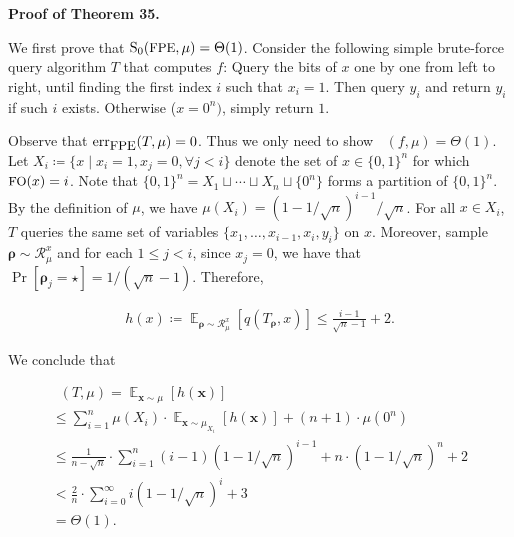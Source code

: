 \par\medskip\noindent\textbf{Proof of Theorem 35.}\par




We first prove that ${\textup{S}}_{0}({\textrm{\small{FPE}}},\mu)=\Theta(1)$.
Consider the following simple brute-force query algorithm $T$ that computes $f$: Query the bits of $x$ one by one from left to right, until finding the first index $i$ such that $x_{i}=1$. Then query $y_{i}$ and return $y_{i}$ if such $i$ exists. Otherwise ($x=0^{n})$, simply return $1$.\par




Observe that $\mathrm{err}_{\textrm{\small{FPE}}}(T,\mu)=0$.
Thus we only need to show $\mathop{\overline{sq}}(f,\mu)=\Theta(1)$.
Let $X_{i}\coloneqq\{x\mid x_{i}=1,x_{j}=0,\forall j<i\}$ denote the set of $x\in\{0,1\}^{n}$ for which ${\textrm{\small{FO}}}(x)=i$.
Note that $\{0,1\}^{n}=X_{1}\sqcup\cdots\sqcup X_{n}\sqcup\{0^{n}\}$ forms a partition of $\{0,1\}^{n}$.
By the definition of $\mu$, we have $\mu(X_{i})=(1-1/\sqrt{n})^{i-1}/\sqrt{n}$.
For all $x\in X_{i}$, $T$ queries the same set of variables $\{x_{1},\ldots,x_{i-1},x_{i},y_{i}\}$ on $x$.
Moreover, sample $\bm{\rho}\sim\mathcal{R}_{\mu}^{x}$ and for each $1\leq j<i$, since $x_{j}=0$, we have that $\Pr[\bm{\rho}_{j}=\star]=1/(\sqrt{n}-1)$. Therefore,\par


\[\begin{gathered}
h(x)\coloneqq\mathop{\mathbb{E}}\nolimits_{\bm{\rho}\sim\mathcal{R}^{x}_{\mu}}[q(T_{\bm{\rho}},x)]\leq\frac{i-1}{\sqrt{n}-1}+2.
\end{gathered}\]


We conclude that\par


\[\begin{gathered}
\displaystyle\mathop{\overline{sq}}(T,\mu) \displaystyle=\mathop{\mathbb{E}}_{\bm{x}\sim\mu}\left[h(\bm{x})\right] \\
\displaystyle\leq\sum\nolimits_{i=1}^{n}\mu(X_{i})\cdot\mathop{\mathbb{E}}\nolimits_{\bm{x}\sim\mu_{X_{i}}}[h(\bm{x})]+(n+1)\cdot\mu(0^{n}) \\
\displaystyle\leq\frac{1}{n-\sqrt{n}}\cdot\sum\nolimits_{i=1}^{n}(i-1)(1-1/\sqrt{n})^{i-1}+n\cdot(1-1/\sqrt{n})^{n}+2 \\
\displaystyle<\frac{2}{n}\cdot\sum\nolimits_{i=0}^{\infty}i(1-1/\sqrt{n})^{i}+3 \\
\displaystyle=\Theta(1).
\end{gathered}\]


